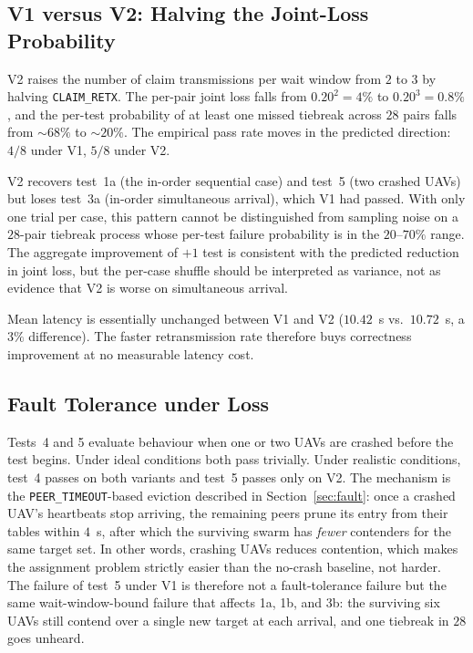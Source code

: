 \documentclass[11pt,letterpaper]{article}
\begin{document}
\subsection{V1 versus V2: Halving the Joint-Loss Probability}

V2 raises the number of claim transmissions per wait window from $2$
to $3$ by halving \texttt{CLAIM\_RETX}. The per-pair joint loss falls
from $0.20^{2}\!=\!4\%$ to $0.20^{3}\!=\!0.8\%$, and the per-test
probability of at least one missed tiebreak across $28$ pairs falls
from $\sim\!68\%$ to $\sim\!20\%$. The empirical pass rate moves in the
predicted direction: $4/8$ under V1, $5/8$ under V2.

V2 recovers test~1a (the in-order sequential case) and test~5 (two
crashed UAVs) but loses test~3a (in-order simultaneous arrival), which
V1 had passed. With only one trial per case, this pattern cannot be
distinguished from sampling noise on a $28$-pair tiebreak process whose
per-test failure probability is in the $20$--$70\%$ range. The
aggregate improvement of $+1$ test is consistent with the predicted
reduction in joint loss, but the per-case shuffle should be
interpreted as variance, not as evidence that V2 is worse on simultaneous
arrival.

Mean latency is essentially unchanged between V1 and V2 ($10.42$~s vs.\
$10.72$~s, a $3\%$ difference). The faster retransmission rate
therefore buys correctness improvement at no measurable latency cost.

\subsection{Fault Tolerance under Loss}

Tests~4 and 5 evaluate behaviour when one or two UAVs are crashed
before the test begins. Under ideal conditions both pass trivially.
Under realistic conditions, test~4 passes on both variants and test~5
passes only on V2. The mechanism is the
\texttt{PEER\_TIMEOUT}-based eviction described in
Section~\ref{sec:fault}: once a crashed UAV's heartbeats stop arriving,
the remaining peers prune its entry from their tables within $4$~s,
after which the surviving swarm has \textit{fewer} contenders for the
same target set. In other words, crashing UAVs reduces contention,
which makes the assignment problem strictly easier than the
no-crash baseline, not harder. The failure of test~5 under V1 is
therefore not a fault-tolerance failure but the same wait-window-bound
failure that affects 1a, 1b, and 3b: the surviving six UAVs still
contend over a single new target at each arrival, and one tiebreak in
$28$ goes unheard.
\end{document}
